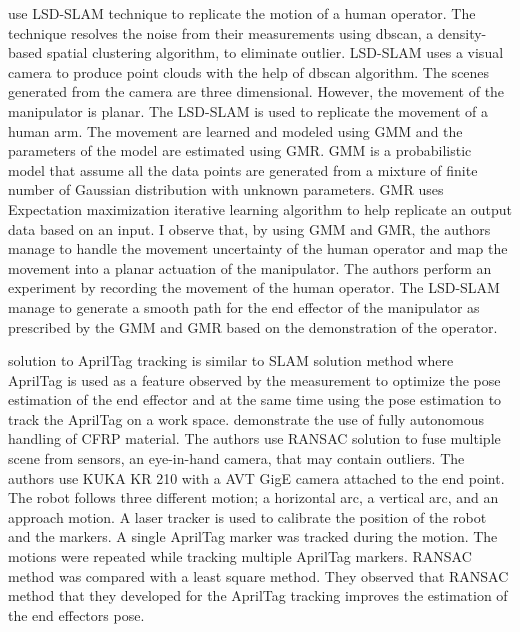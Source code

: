 \textcite{Sun2016} use \acrfull{LSD-SLAM} technique to replicate
the motion of a human operator. The technique resolves the noise from their measurements
using dbscan, a density-based spatial clustering algorithm, to eliminate outlier. LSD-SLAM uses
a visual camera to produce point clouds with the help of dbscan algorithm. The scenes
generated from the camera are three dimensional. However, the movement of the manipulator
is planar. The LSD-SLAM is used to replicate the movement of a human arm. The movement
are learned and modeled using \acrfull{GMM} and the parameters of the
model are estimated using \acrfull{GMR}. GMM is a probabilistic model
that assume all the data points are generated from a mixture of finite number of Gaussian
distribution with unknown parameters. GMR uses Expectation maximization iterative learning
algorithm to help replicate an output data based on an input. I observe that, by using GMM
and GMR, the authors manage to handle the movement uncertainty of the human operator and
map the movement into a planar actuation of the manipulator. The authors perform an
experiment by recording the movement of the human operator. The LSD-SLAM manage to
generate a smooth path for the end effector of the manipulator as prescribed by the GMM and
GMR based on the demonstration of the operator.

\textcite{Nissler2016} solution to AprilTag tracking is similar to SLAM solution method
where AprilTag is used as a feature observed by the measurement to optimize the pose
estimation of the end effector and at the same time using the pose estimation to track the
AprilTag on a work space. \textcite{Nissler2016} demonstrate the use of fully autonomous
handling of CFRP material. The authors use RANSAC solution to fuse multiple scene from
sensors, an eye-in-hand camera, that may contain outliers. The authors use KUKA KR 210 with
a AVT GigE camera attached to the end point. The robot follows three different motion; a
horizontal arc, a vertical arc, and an approach motion. A laser tracker is used to calibrate the
position of the robot and the markers. A single AprilTag marker was tracked during the motion.
The motions were repeated while tracking multiple AprilTag markers. RANSAC method was
compared with a least square method. They observed that RANSAC method that they
developed for the AprilTag tracking improves the estimation of the end effectors pose.

